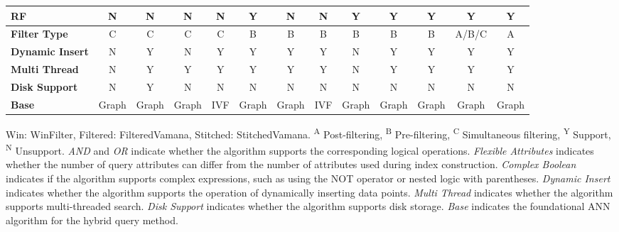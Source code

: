 \documentclass[sigconf, nonacm]{acmart}
\begin{document}
\begin{table}[t]
\begin{tabular}{|l|l|*{12}{c|}}
		\multicolumn{2}{|l|}{\textbf{RF}}             & N & N & N & N & Y & N & N & Y & Y & Y & Y & Y \\ \hline
		\multicolumn{2}{|l|}{\textbf{Filter Type }}             & C & C & C & C & B & B & B & B & B & B & A/B/C & A \\ \hline
		\multicolumn{2}{|l|}{\textbf{Dynamic Insert}} & N & Y & N & Y & Y & Y & Y & N & Y & Y & Y & Y \\ \hline
		\multicolumn{2}{|l|}{\textbf{Multi Thread}}   & N & Y & Y & Y & Y & Y & Y & N & Y & Y & Y & Y \\ \hline
		\multicolumn{2}{|l|}{\textbf{Disk Support}}           &N  & Y& N & N & N & N & N & N & N & N & N & N \\ \hline
		\multicolumn{2}{|l|}{\textbf{Base}}           & Graph & Graph & Graph & IVF & Graph & Graph & IVF & Graph & Graph & Graph & Graph & Graph \\ \hline
	\end{tabular}
	
	
	
	\centering
	\footnotesize{
		\begin{minipage}{\linewidth}
			\vspace{0.1cm}
			Win: WinFilter, Filtered: FilteredVamana, Stitched: StitchedVamana. 
			\textsuperscript{A} Post-filtering, 
			\textsuperscript{B} Pre-filtering, 
			\textsuperscript{C} Simultaneous filtering, 
			\textsuperscript{Y} Support, 
			\textsuperscript{N} Unsupport. 
			\textit{AND} and \textit{OR} indicate whether the algorithm supports the corresponding logical operations.
			\textit{Flexible Attributes} indicates whether the number of query attributes can differ from the number of attributes used during index construction. 
			\textit{Complex Boolean} indicates if the algorithm supports complex expressions, such as using the NOT operator or nested logic with parentheses.
			\textit{Dynamic Insert} indicates whether the algorithm supports the operation of dynamically inserting data points.
			\textit{Multi Thread} indicates whether the algorithm supports multi-threaded search.
			\textit{Disk Support} indicates whether the algorithm supports disk storage.
			\textit{Base} indicates the foundational ANN algorithm for the hybrid query method.
	\end{minipage}}
	
\end{table}
\end{document}
